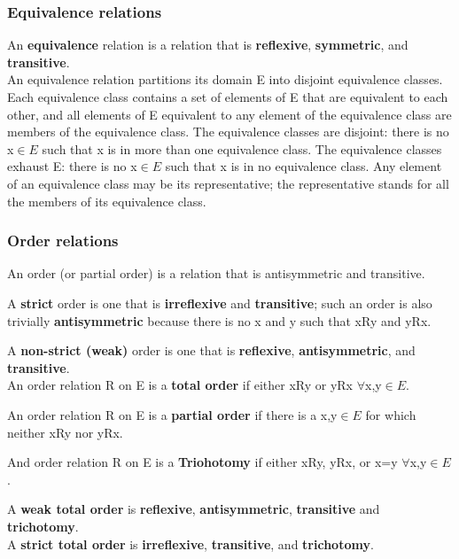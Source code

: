 \subsubsection{Equivalence relations}
An \textbf{equivalence} relation is a relation that is \textbf{reflexive}, \textbf{symmetric}, and \textbf{transitive}. \\
An equivalence relation partitions its domain E into disjoint equivalence classes. 
Each equivalence class contains a set of elements of E that are equivalent to each other, and all elements of E equivalent to any element of the equivalence class are members of the equivalence class. 
The equivalence classes are disjoint:  there is no x$\in{E}$ such that x is in more than one equivalence class. 
The equivalence classes exhaust E:  there is no x$\in{E}$ such that x is in no equivalence class. 
Any element of an equivalence class may be its representative; the representative stands for all the members of its equivalence class. 

\subsubsection{Order relations}
An order (or partial order) is a relation that is antisymmetric and transitive. 

A  \textbf{strict} order is one that is \textbf{irreflexive} and  \textbf{transitive}; such an order is also trivially  \textbf{antisymmetric} because there is no x and y such that xRy and yRx. 

A \textbf{non-strict (weak)} order is one that is \textbf{reflexive}, \textbf{antisymmetric}, and \textbf{transitive}. \\

An order relation R on E is a \textbf{total order} if either xRy or yRx $\forall$x,y$\in{E}$. 

An order relation R on E is a \textbf{partial order} if there is a  x,y$\in{E}$ for which neither xRy nor yRx. 

And order relation R on E is a \textbf{Triohotomy} if either xRy, yRx, or x=y $\forall$x,y$\in{E}$.

A \textbf{weak total order} is \textbf{reflexive}, \textbf{antisymmetric}, \textbf{transitive} and \textbf{trichotomy}. \\
A \textbf{strict total order} is \textbf{irreflexive}, \textbf{transitive}, and \textbf{trichotomy}.

